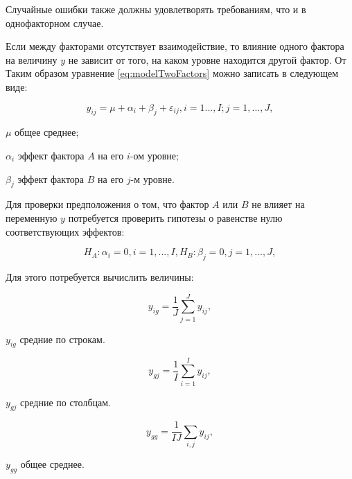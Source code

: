Случайные ошибки также должны удовлетворять требованиям, что и в однофакторном случае.

Если между факторами отсутствует взаимодействие, то влияние одного фактора на величину $y$ не зависит от того, на каком уровне находится другой фактор. От Таким образом уравнение \eqref{eq:modelTwoFactors} можно записать в следующем виде:

\begin{equation}
\label{eq:newModel}
y_{ij}=\mu+\alpha_i+\beta_j+\varepsilon_{ij}, i=1...,I;j=1,...,J,
\end{equation}
\begin{eqexpl}[15mm]
\item{$\mu$} общее среднее;
\item{$\alpha_i$} эффект фактора $A$ на его $i$-ом уровне;
\item{$\beta_j$} эффект фактора $B$ на его $j$-м уровне.
\end{eqexpl}

Для проверки предположения о том, что фактор $A$ или $B$ не влияет на переменную $y$ потребуется проверить гипотезы о равенстве нулю соответствующих эффектов:

\begin{equation}
\label{eq:hyposForNewModel}
H_A:\alpha_i=0,i=1,...,I, H_B:\beta_j=0,j=1,...,J,
\end{equation}

Для этого потребуется вычислить величины:

\begin{equation}
\label{eq:yignew}
y_{ig}=\frac{1}{J}\sum_{j=1}^{J}{y_{ij}},
\end{equation}
\begin{eqexpl}[15mm]
\item{$y_{ig}$} средние по строкам.
\end{eqexpl}

\begin{equation}
\label{eq:ygjnew}
y_{gj}=\frac{1}{I}\sum_{i=1}^{I}{y_{ij}},
\end{equation}
\begin{eqexpl}[15mm]
\item{$y_{gj}$} средние по столбцам.
\end{eqexpl}

\begin{equation}
\label{eq:yggnew}
y_{gg}=\frac{1}{IJ}\sum_{i,j}{y_{ij}},
\end{equation}
\begin{eqexpl}[15mm]
\item{$y_{gg}$} общее среднее.
\end{eqexpl}

